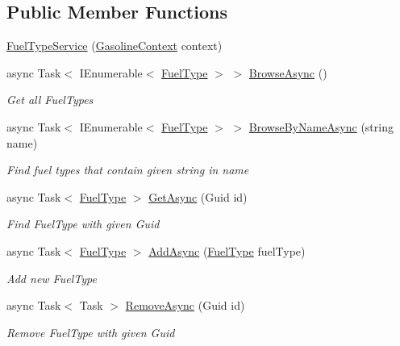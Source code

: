 \subsection*{Public Member Functions}
\begin{DoxyCompactItemize}
\item 
\mbox{\hyperlink{class_gasoline_1_1_data_1_1_services_1_1_fuel_type_service_a59eec788fd36117311ee0b58dd5e1f9a}{Fuel\+Type\+Service}} (\mbox{\hyperlink{class_gasoline_1_1_data_1_1_e_f_1_1_gasoline_context}{Gasoline\+Context}} context)
\item 
async Task$<$ I\+Enumerable$<$ \mbox{\hyperlink{class_gasoline_1_1_data_1_1_models_1_1_fuel_type}{Fuel\+Type}} $>$ $>$ \mbox{\hyperlink{class_gasoline_1_1_data_1_1_services_1_1_fuel_type_service_a8255c7d8d62590890d09b618ef679b41}{Browse\+Async}} ()
\begin{DoxyCompactList}\small\item\em Get all Fuel\+Types \end{DoxyCompactList}\item 
async Task$<$ I\+Enumerable$<$ \mbox{\hyperlink{class_gasoline_1_1_data_1_1_models_1_1_fuel_type}{Fuel\+Type}} $>$ $>$ \mbox{\hyperlink{class_gasoline_1_1_data_1_1_services_1_1_fuel_type_service_a3aff4edf14e7e4b320268f0383a9209c}{Browse\+By\+Name\+Async}} (string name)
\begin{DoxyCompactList}\small\item\em Find fuel types that contain given string in name \end{DoxyCompactList}\item 
async Task$<$ \mbox{\hyperlink{class_gasoline_1_1_data_1_1_models_1_1_fuel_type}{Fuel\+Type}} $>$ \mbox{\hyperlink{class_gasoline_1_1_data_1_1_services_1_1_fuel_type_service_a9993b394d47b8cb7712fc526bf36e3e0}{Get\+Async}} (Guid id)
\begin{DoxyCompactList}\small\item\em Find Fuel\+Type with given Guid \end{DoxyCompactList}\item 
async Task$<$ \mbox{\hyperlink{class_gasoline_1_1_data_1_1_models_1_1_fuel_type}{Fuel\+Type}} $>$ \mbox{\hyperlink{class_gasoline_1_1_data_1_1_services_1_1_fuel_type_service_ace9a723344fbcdbd8d8f05a6d93bf56a}{Add\+Async}} (\mbox{\hyperlink{class_gasoline_1_1_data_1_1_models_1_1_fuel_type}{Fuel\+Type}} fuel\+Type)
\begin{DoxyCompactList}\small\item\em Add new Fuel\+Type \end{DoxyCompactList}\item 
async Task$<$ Task $>$ \mbox{\hyperlink{class_gasoline_1_1_data_1_1_services_1_1_fuel_type_service_a304619cc0643282249d7ce2619340eee}{Remove\+Async}} (Guid id)
\begin{DoxyCompactList}\small\item\em Remove Fuel\+Type with given Guid \end{DoxyCompactList}\end{DoxyCompactItemize}
